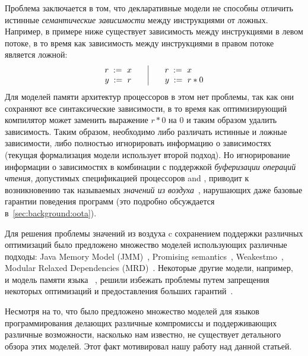 Проблема заключается в том, что декларативные модели не способны 
отличить истинные \emph{семантические зависимости} между инструкциями от ложных.
Например, в примере ниже существует  зависимость между 
инструкциями в левом потоке, в то время как зависимость между 
инструкциями в правом потоке является ложной:
\[\begin{array}{l@{\qquad}|@{\qquad}l}
\readInst{}{r}{x} & \readInst{}{r}{x} \\
\writeInst{}{y}{r} & \readInst{}{y}{r * 0} \\
\end{array}\]
Для моделей памяти архитектур процессоров в этом нет проблемы, 
так как они сохраняют все синтаксические зависимости, 
в то время как оптимизирующий компилятор может заменить выражение 
$r * 0$ на $0$ и таким образом удалить зависимость. 
Таким образом, необходимо либо различать истинные и ложные зависимости, 
либо полностью игнорировать информацию о зависимостях 
(текущая формализация модели \CPP использует второй подход).
Но игнорирование информации о зависимостях в комбинации с 
поддержкой \emph{буферизации операций чтения}, допустимых 
спецификацией процессоров \ARM and \POWER, 
приводит к возникновению так называемых 
\emph{значений из воздуха}~\cite{Boehm-Demsky:MSPC14}, 
нарушающих даже базовые гарантии  поведения программ
(это подробно обсуждается в~\cref{sec:background:oota}).

Для решения проблемы значений из воздуха c сохранением
поддержки различных оптимизаций было предложено 
множество моделей использующих различные подходы:
Java Memory Model (JMM)~\cite{Manson-al:POPL05}, Promising semantics~\cite{Kang-al:POPL17,Lee-al:PLDI20},
Weakestmo~\cite{Chakraborty-Vafeiadis:POPL19}, Modular Relaxed Dependencies (MRD)~\cite{Paviotti-al:ESOP20}.
Некоторые другие модели, например, \RCMM~\cite{Lahav-al:PLDI17} и модель памяти языка \OCaml~\cite{Dolan-al:PLDI18},
решили избежать проблемы путем запрещения некоторых оптимизаций и предоставления больших гарантий~\cite{Ou-Demsky:OOPSLA18}.

Несмотря на то, что было предложено множество моделей для языков программирования
делающих различные компромиссы и поддерживающих различные возможности, 
насколько нам известно, не существует детального обзора этих моделей. 
Этот факт мотивировал нашу работу над данной статьей.

